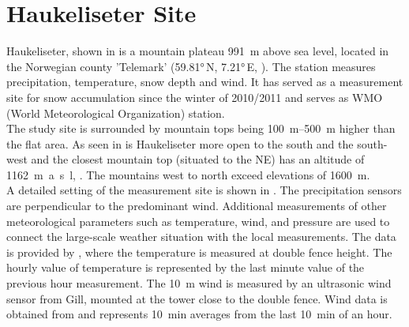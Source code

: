 \section{Haukeliseter Site}\label{sec:dim:site}

Haukeliseter, shown in  is a mountain plateau \SI{991}{\m} above sea level, located in the Norwegian county 'Telemark' (\ang{59.81}\,N, \ang{7.21}\,E, ). The station measures precipitation, temperature, snow depth and wind. It has served as a measurement site for snow accumulation since the winter of 2010/2011 \citep{wolff_new_2010, wolff_measurements_2013, wolff_derivation_2015} and serves as WMO (World Meteorological Organization) station. \\
The study site is surrounded by mountain tops being \SIrange{100}{500}{\metre} higher than the flat area. As seen in  is Haukeliseter more open to the south and the south-west and the closest mountain top (situated to the NE) has an altitude of \SI{1162}{\metre a.s.l},  \citep{wolff_derivation_2015}. The mountains west to north exceed elevations of \SI{1600}{\metre}.
\\
A detailed setting of the measurement site is shown in . The precipitation sensors are perpendicular to the predominant wind. Additional measurements of other meteorological parameters such as temperature, wind, and pressure are used to connect the large-scale weather situation with the local measurements. The data is provided by \citet{eklima_norwegian_2016}, where the temperature is measured at double fence height. The hourly value of temperature is represented by the last minute value of the previous hour measurement. The \SI{10}{\metre} wind is measured by an ultrasonic wind sensor from Gill, mounted at the tower close to the double fence. Wind data is obtained from \citet{eklima_norwegian_2016} and represents \SI{10}{\minute} averages from the last \SI{10}{\minute} of an hour.
